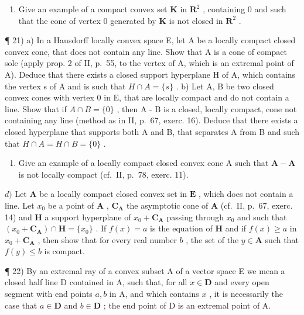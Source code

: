 \begin{enumerate}
\def\labelenumi{\arabic{enumi})}
\setcounter{enumi}{19}
\tightlist
\item
  Give an example of a compact convex set \(\mathbf{K}\) in \(\mathbf{R}^2\) , containing 0 and such that the cone of vertex 0 generated by \(\mathbf{K}\) is not closed in \(\mathbf{R}^2\) .
\end{enumerate}

¶ 21) a) In a Hausdorff locally convex space E, let A be a locally compact closed convex cone, that does not contain any line. Show that A is a cone of compact sole (apply prop. 2 of II, p.~55, to the vertex of A, which is an extremal point of A). Deduce that there exists a closed support hyperplane H of A, which contains the vertex s of A and is such that \(H \cap A = \{s\}\) . b) Let A, B be two closed convex cones with vertex 0 in E, that are locally compact and do not contain a line. Show that if \(A \cap B = \{0\}\) , then A - B is a closed, locally compact, cone not containing any line (method as in II, p.~67, exerc. 16). Deduce that there exists a closed hyperplane that supports both A and B, that separates A from B and such that \(H \cap A = H \cap B = \{0\}\) .

\begin{enumerate}
\def\labelenumi{\alph{enumi})}
\setcounter{enumi}{2}
\tightlist
\item
  Give an example of a locally compact closed convex cone A such that \(\mathbf{A} - \mathbf{A}\) is not locally compact (cf.~II, p.~78, exerc. 11).
\end{enumerate}

\(d)\) Let \(\mathbf{A}\) be a locally compact closed convex set in \(\mathbf{E}\) , which does not contain a line. Let \(x_0\) be a point of \(\mathbf{A}\) , \(\mathbf{C}_{\mathbf{A}}\) the asymptotic cone of \(\mathbf{A}\) (cf.~II, p.~67, exerc. 14) and \(\mathbf{H}\) a support hyperplane of \(x_0 + \mathbf{C}_{\mathbf{A}}\) passing through \(x_0\) and such that \((x_0 + \mathbf{C}_{\mathbf{A}}) \cap \mathbf{H} = \{x_0\}\) . If \(f(x) = a\) is the equation of \(\mathbf{H}\) and if \(f(x) \geqslant a\) in \(x_0 + \mathbf{C}_{\mathbf{A}}\) , then show that for every real number \(b\) , the set of the \(y \in \mathbf{A}\) such that \(f(y) \leqslant b\) is compact.

¶ 22) By an extremal ray of a convex subset A of a vector space E we mean a closed half line D contained in A, such that, for all \(x \in \mathbf{D}\) and every open segment with end points \(a, b\) in A, and which contains \(x\) , it is necessarily the case that \(a \in \mathbf{D}\) and \(b \in \mathbf{D}\) ; the end point of D is an extremal point of A.

